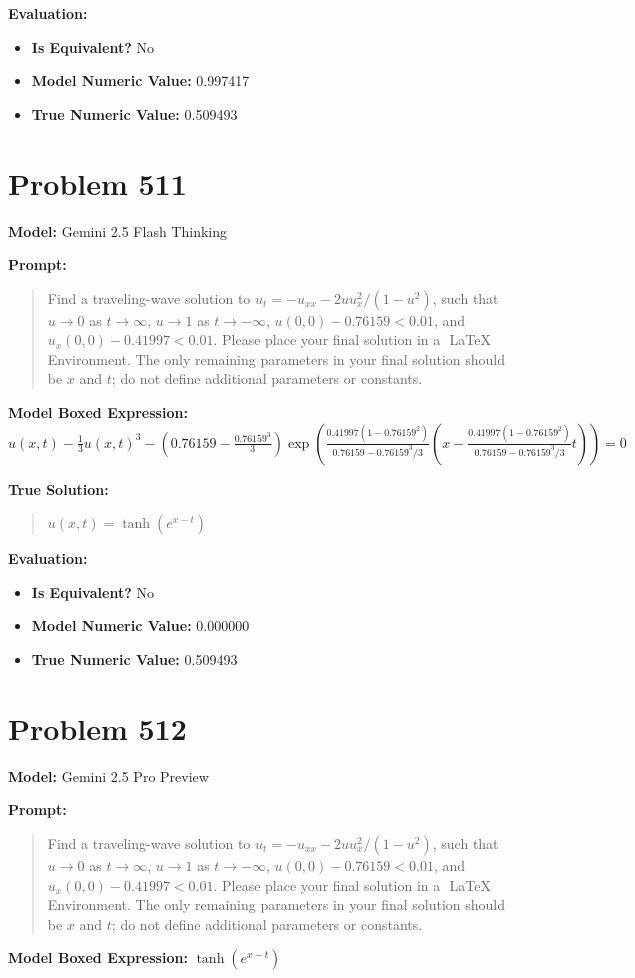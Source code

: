 \documentclass{article}
\begin{document}
\textbf{Evaluation:}
\begin{itemize}
\item \textbf{Is Equivalent?} No
\item \textbf{Model Numeric Value:} 0.997417
\item \textbf{True Numeric Value:} 0.509493
\end{itemize}
\vspace{1cm}
\section*{Problem 511}
\textbf{Model:} Gemini 2.5 Flash Thinking

\textbf{Prompt:}
\begin{quote}
Find a traveling-wave solution to $u_t = -u_{xx} - 2 u u_x^2/(1 - u^2)$, such that $u \rightarrow 0$ as $t \rightarrow \infty$, $u \rightarrow 1$ as $t \rightarrow -\infty$, $u(0,0) - 0.76159 < 0.01$, and $u_x(0,0) - 0.41997 < 0.01$. Please place your final solution in a $\boxed{}$ LaTeX Environment. The only remaining parameters in your final solution should be $x$ and $t$; do not define additional parameters or constants.
\end{quote}
\textbf{Model Boxed Expression:} $u(x,t) - \frac{1}{3}u(x,t)^3 - \left(0.76159-\frac{0.76159^3}{3}\right) \exp\left(\frac{0.41997(1-0.76159^2)}{0.76159-0.76159^3/3}\left(x-\frac{0.41997(1-0.76159^2)}{0.76159-0.76159^3/3} t\right)\right) = 0$

\textbf{True Solution:}
\begin{quote}
$u(x,t) = \tanh(e^{x - t})$
\end{quote}

\textbf{Evaluation:}
\begin{itemize}
\item \textbf{Is Equivalent?} No
\item \textbf{Model Numeric Value:} 0.000000
\item \textbf{True Numeric Value:} 0.509493
\end{itemize}
\vspace{1cm}
\section*{Problem 512}
\textbf{Model:} Gemini 2.5 Pro Preview

\textbf{Prompt:}
\begin{quote}
Find a traveling-wave solution to $u_t = -u_{xx} - 2 u u_x^2/(1 - u^2)$, such that $u \rightarrow 0$ as $t \rightarrow \infty$, $u \rightarrow 1$ as $t \rightarrow -\infty$, $u(0,0) - 0.76159 < 0.01$, and $u_x(0,0) - 0.41997 < 0.01$. Please place your final solution in a $\boxed{}$ LaTeX Environment. The only remaining parameters in your final solution should be $x$ and $t$; do not define additional parameters or constants.
\end{quote}
\textbf{Model Boxed Expression:} $\tanh(e^{x-t})$
\end{document}
